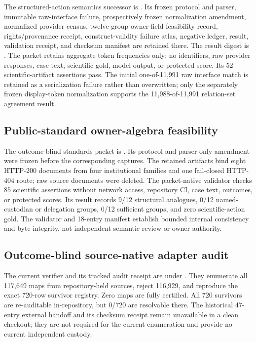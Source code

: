The structured-action semantics successor is
. Its frozen
protocol and parser, immutable raw-interface failure, prospectively frozen
normalization amendment, normalized provider census, twelve-group owner-field
feasibility record, rights/provenance receipt, construct-validity failure atlas,
negative ledger, result, validation receipt, and checksum manifest are retained
there. The result digest is
.
The packet retains aggregate token frequencies only: no identifiers, raw
provider responses, case text, scientific gold, model output, or protected
score. Its 52 scientific-artifact assertions pass. The initial one-of-11,991
raw interface match is retained as a serialization failure rather than
overwritten; only the separately frozen display-token normalization supports
the 11,988-of-11,991 relation-set agreement result.

\subsection{Public-standard owner-algebra feasibility}
The outcome-blind standards packet is
.
Its protocol and parser-only amendment were frozen before the corresponding
captures. The retained artifacts bind eight HTTP-200 documents from four
institutional families and one fail-closed HTTP-404 route; raw source documents
were deleted. The packet-native validator checks 85 scientific assertions
without network access, repository CI, case text, outcomes, or protected
scores. Its result records 9/12 structural analogues, 0/12 named-custodian or
delegation groups, 0/12 sufficient groups, and zero scientific-action gold.
The validator and 18-entry manifest establish bounded internal consistency and
byte integrity, not independent semantic review or owner authority.

\subsection{Outcome-blind source-native adapter audit}
The current verifier and its tracked audit receipt are under
. They enumerate all 117,649 maps from
repository-held sources, reject 116,929, and reproduce the exact 720-row
survivor registry. Zero maps are fully certified. All 720 survivors are
re-auditable in-repository, but 0/720 are resolvable there. The historical
47-entry external handoff and its checksum receipt remain unavailable in a
clean checkout; they are not required for the current enumeration and provide
no current independent custody.

